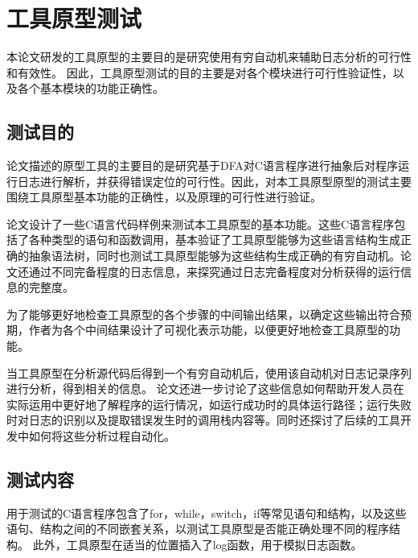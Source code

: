\chapter{工具原型测试}
本论文研发的工具原型的主要目的是研究使用有穷自动机来辅助日志分析的可行性和有效性。
因此，工具原型测试的目的主要是对各个模块进行可行性验证性，以及各个基本模块的功能正确性。


\section{测试目的}
论文描述的原型工具的主要目的是研究基于DFA对C语言程序进行抽象后对程序运行日志进行解析，并获得错误定位的可行性。因此，对本工具原型原型的测试主要围绕工具原型基本功能的正确性，以及原理的可行性进行验证。

论文设计了一些C语言代码样例来测试本工具原型的基本功能。这些C语言程序包括了各种类型的语句和函数调用，基本验证了工具原型能够为这些语言结构生成正确的抽象语法树，同时也测试工具原型能够为这些结构生成正确的有穷自动机。论文还通过不同完备程度的日志信息，来探究通过日志完备程度对分析获得的运行信息的完整度。

为了能够更好地检查工具原型的各个步骤的中间输出结果，以确定这些输出符合预期，作者为各个中间结果设计了可视化表示功能，以便更好地检查工具原型的功能。

当工具原型在分析源代码后得到一个有穷自动机后，使用该自动机对日志记录序列进行分析，得到相关的信息。
论文还进一步讨论了这些信息如何帮助开发人员在实际运用中更好地了解程序的运行情况，如运行成功时的具体运行路径；运行失败时对日志的识别以及提取错误发生时的调用栈内容等。同时还探讨了后续的工具开发中如何将这些分析过程自动化。

\section{测试内容}
用于测试的C语言程序包含了for，while，switch，if等常见语句和结构，以及这些语句、结构之间的不同嵌套关系，以测试工具原型是否能正确处理不同的程序结构。
此外，工具原型在适当的位置插入了log函数，用于模拟日志函数。

